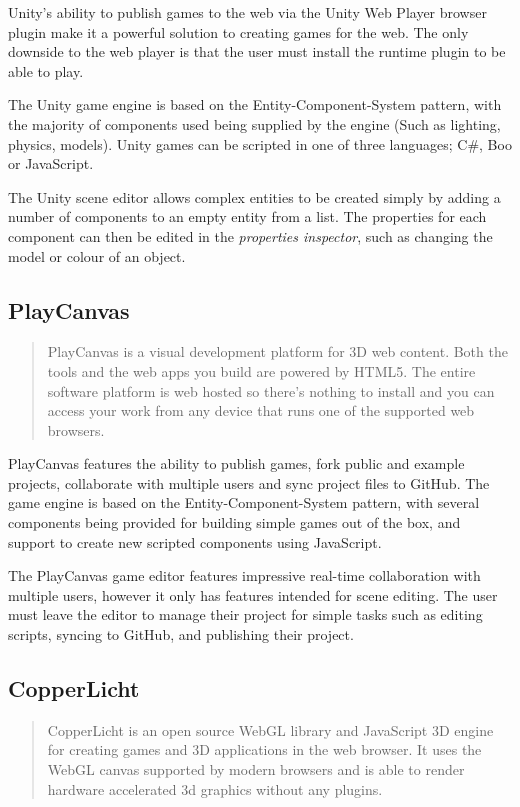 Unity's ability to publish games to the web via the Unity Web Player browser plugin make it a powerful solution to creating games for the web. The only downside to the web player is that the user must install the runtime plugin to be able to play.\cite{unityweb}

The Unity game engine is based on the Entity-Component-System pattern, with the majority of components used being supplied by the engine (Such as lighting, physics, models).\cite{unitycomponents} Unity games can be scripted in one of three languages; C\#, Boo or JavaScript.

The Unity scene editor allows complex entities to be created simply by adding a number of components to an empty entity from a list. The properties for each component can then be edited in the \emph{properties inspector}, such as changing the model or colour of an object. \cite{unitycreatingscenes}


\subsection{PlayCanvas}
\begin{quote}
PlayCanvas is a visual development platform for 3D web content. Both the tools and the web apps you build are powered by HTML5. The entire software platform is web hosted so there's nothing to install and you can access your work from any device that runs one of the supported web browsers.\cite{playcanvas}
\end{quote}

PlayCanvas features the ability to publish games, fork public and example projects, collaborate with multiple users and sync project files to GitHub. The game engine is based on the Entity-Component-System pattern, with several components being provided for building simple games out of the box, and support to create new scripted components using JavaScript.\cite{playcanvas}

The PlayCanvas game editor features impressive real-time collaboration with multiple users, however it only has features intended for scene editing. The user must leave the editor to manage their project for simple tasks such as editing scripts, syncing to GitHub, and publishing their project.

\subsection{CopperLicht}
\begin{quote}
CopperLicht is an open source WebGL library and JavaScript 3D engine for creating games and 3D applications in the web browser. It uses the WebGL canvas supported by modern browsers and is able to render hardware accelerated 3d graphics without any plugins.\cite{copperlicht}
\end{quote}

